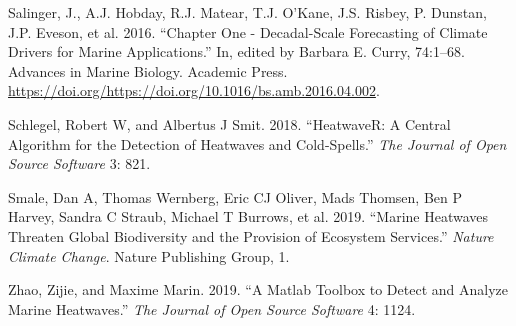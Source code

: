 \documentclass[]{article}
\begin{document}
\leavevmode\hypertarget{ref-Salinger2016}{}%
Salinger, J., A.J. Hobday, R.J. Matear, T.J. O'Kane, J.S. Risbey, P.
Dunstan, J.P. Eveson, et al. 2016. ``Chapter One - Decadal-Scale
Forecasting of Climate Drivers for Marine Applications.'' In, edited by
Barbara E. Curry, 74:1--68. Advances in Marine Biology. Academic Press.
\url{https://doi.org/https://doi.org/10.1016/bs.amb.2016.04.002}.

\leavevmode\hypertarget{ref-Schlegel2018}{}%
Schlegel, Robert W, and Albertus J Smit. 2018. ``HeatwaveR: A Central
Algorithm for the Detection of Heatwaves and Cold-Spells.'' \emph{The
Journal of Open Source Software} 3: 821.

\leavevmode\hypertarget{ref-Smale2019}{}%
Smale, Dan A, Thomas Wernberg, Eric CJ Oliver, Mads Thomsen, Ben P
Harvey, Sandra C Straub, Michael T Burrows, et al. 2019. ``Marine
Heatwaves Threaten Global Biodiversity and the Provision of Ecosystem
Services.'' \emph{Nature Climate Change}. Nature Publishing Group, 1.

\leavevmode\hypertarget{ref-Zhao2019}{}%
Zhao, Zijie, and Maxime Marin. 2019. ``A Matlab Toolbox to Detect and
Analyze Marine Heatwaves.'' \emph{The Journal of Open Source Software}
4: 1124.
\end{document}
